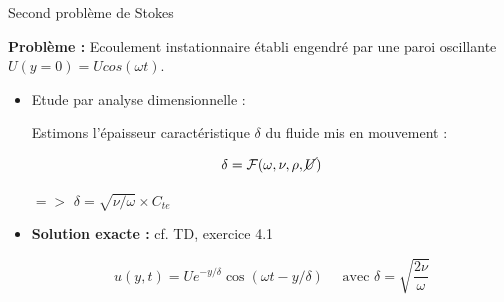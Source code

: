 \begin{frame}{Second problème de Stokes}

{\bf Problème :} Ecoulement instationnaire établi engendré par une paroi oscillante $U(y=0) = U cos (\omega t)$.


\bigskip

\begin{itemize}

\item Etude par analyse dimensionnelle :

Estimons l'épaisseur caractéristique $\delta$ du fluide mis en mouvement :

$$
\delta = {\cal F} ( \omega, \nu, \rho, \cancel{U}) 
$$



$=>$ $\delta = \sqrt{\nu / \omega} \times C_{te}$


\item {\bf Solution exacte :}  cf. TD, exercice 4.1 

$$
u(y,t) = U e^{-y/\delta} \cos (\omega t - y/\delta) \quad \mbox{ avec } \delta = \sqrt{\frac{2 \nu }{\omega}}
$$

\end{itemize}

\end{frame}



